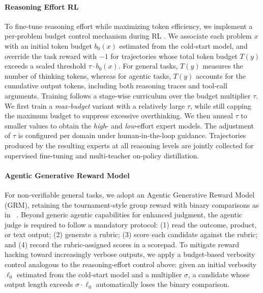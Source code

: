 \paragraph{Reasoning Effort RL}

To fine-tune reasoning effort while maximizing token efficiency, we implement a per-problem budget control mechanism during RL \citep{kimik25}. 
We associate each problem $x$ with an initial token budget $b_0(x)$ estimated from the cold-start model, and override the task reward with $-1$ for trajectories whose total token budget $T(y)$ exceeds a scaled threshold $\tau \cdot b_0(x)$. 
For general tasks, $T(y)$ measures the number of thinking tokens, whereas for agentic tasks, $T(y)$ accounts for the cumulative output tokens, including both reasoning traces and tool-call arguments. 
Training follows a stage-wise curriculum over the budget multiplier $\tau$. We first train a \emph{max-budget} variant with a relatively large $\tau$, while still capping the maximum budget to suppress excessive overthinking. We then anneal $\tau$ to smaller values to obtain the \emph{high}- and \emph{low}-effort expert models. 
The adjustment of $\tau$ is configured per domain under human-in-the-loop guidance. Trajectories produced by the resulting experts at all reasoning levels are jointly collected for supervised fine-tuning and multi-teacher on-policy distillation.

\paragraph{Agentic Generative Reward Model}
For non-verifiable general tasks, we adopt an Agentic Generative Reward Model (GRM), retaining the tournament-style group reward with binary comparisons as in ~\cite{kimiteam2025kimik2openagentic,kimik25}. Beyond generic agentic capabilities for enhanced judgment, the agentic judge is required to follow a mandatory protocol: (1) read the outcome, product, or text output; (2) generate a rubric; (3) score each candidate against the rubric; and (4) record the rubric-assigned scores in a scorepad. To mitigate reward hacking toward increasingly verbose outputs, we apply a budget-based verbosity control analogous to the reasoning-effort control above: given an initial verbosity $\ell_0$ estimated from the cold-start model and a multiplier $\sigma$, a candidate whose output length exceeds $\sigma \cdot \ell_0$ automatically loses the binary comparison.





